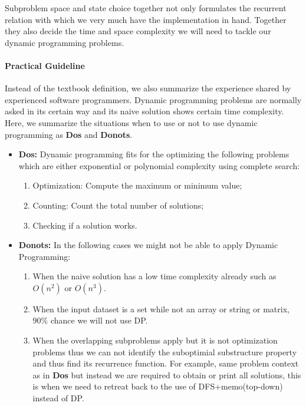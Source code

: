 \documentclass[../main.tex]{subfiles}
\begin{document}
Subproblem space and state choice together not only formulates the recurrent relation with which we very much have the implementation in hand. Together they also decide the time and space complexity we will need to tackle our dynamic programming problems. 

\paragraph{Practical Guideline}
Instead of the textbook definition, we also summarize the experience shared by experienced software programmers. Dynamic programming problems are normally asked in its certain way and its naive solution shows certain time complexity. Here, we summarize the situations when to use or not to use dynamic programming as \textbf{Dos} and \textbf{Donots}. 
\begin{itemize}
    \item  \textbf{Dos:} Dynamic programming fits for the optimizing the following problems which are either exponential or polynomial complexity using complete search:
\begin{enumerate}
    \item Optimization: Compute the maximum or minimum value;
    \item Counting: Count the total number of solutions; 
    \item Checking if a solution works.
\end{enumerate}

\item \textbf{Donots:}  In the following cases we might not be able to apply Dynamic Programming:
\begin{enumerate}
    \item When the naive solution has a low time complexity already such as $O(n^2)$ or $O(n^3)$.
    \item   When the input dataset is a set while not an array or string or matrix, $90\%$ chance we will not use DP.
    \item  When the overlapping subproblems apply but it is not optimization problems thus we can not identify the suboptimial substructure property and thus find its recurrence function. For example, same problem context as in \textbf{Dos} but instead we are required to obtain or print all solutions, this is when we need to retreat back to the use of DFS+memo(top-down) instead of DP. %

\end{enumerate}
\end{itemize}
\end{document}
